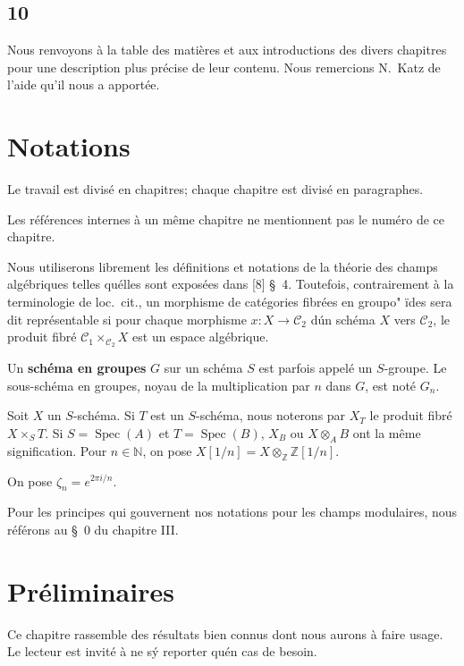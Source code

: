 \documentclass{amsart}
\theoremstyle{plain}
\theoremstyle{remark}
\DeclareMathOperator{\Spec}{Spec}
\newcommand{\bbN}{\mathbb{N}}
\newcommand{\bbZ}{\mathbb{Z}}
\begin{document}
\subsection*{10}
Nous renvoyons \`a la table des mati\`eres et aux introductions des divers chapitres pour une description plus pr\'ecise de leur contenu. Nous remercions N.~Katz de l'aide qu'il nous a apport\'ee.

\section{Notations}

Le travail est divis\'e en chapitres; chaque chapitre est divis\'e en paragraphes.

Les r\'ef\'erences internes \`a un m\^eme chapitre ne mentionnent pas le num\'ero de ce chapitre.

Nous utiliserons librement les d\'efinitions et notations de la th\'eorie des champs
alg\'ebriques telles qu\'elles sont expos\'ees dans [8] \S~4. Toutefois, contrairement
\`a la terminologie de loc.~cit., un morphisme de cat\'egories fibr\'ees en groupo"
ïdes sera dit repr\'esentable si pour chaque morphisme $x: X \to \mathscr{C}_2$ d\'un
sch\'ema $X$ vers $\mathscr{C}_2$, le produit fibr\'e $\mathscr{C}_1 \times_{\mathscr{C}_2} X$ est un espace
alg\'ebrique.

Un \textbf{sch\'ema en groupes} $G$ sur un sch\'ema $S$ est parfois appel\'e un $S$-groupe.
Le sous-sch\'ema en groupes, noyau de la multiplication par $n$ dans $G$, est not\'e $G_n$.

Soit $X$ un $S$-sch\'ema. Si $T$ est un $S$-sch\'ema, nous noterons par $X_T$ le produit
fibr\'e $X \times_S T$. Si $S = \Spec(A)$ et $T = \Spec(B)$, $X_B$ ou $X \otimes_A B$
ont la m\^eme signification. Pour $n \in \bbN$, on pose $X[1/n] = X \otimes_{\bbZ} \bbZ[1/n]$.

On pose $\zeta_n = e^{2\pi i/n}$.

Pour les principes qui gouvernent nos notations pour les champs modulaires,
nous r\'ef\'erons au \S~0 du chapitre III.

\newpage
\section{Pr\'eliminaires}

Ce chapitre rassemble des r\'esultats bien connus dont nous aurons \`a faire usage.
Le lecteur est invit\'e \`a ne s\'y reporter qu\'en cas de besoin.
\end{document}
